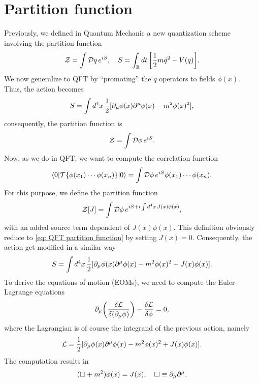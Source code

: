 \section{Partition function}
Previously, we defined in Quantum Mechanic a new quantization scheme involving the partition function 
\begin{equation}
    \mathcal{Z} = \int \mathcal{D} q\,e^{iS},\quad S = \int_{\mathbb{R}} dt\,\bigg[\frac{1}{2}m\dot{q}^2 - V(q)\bigg].
\end{equation}
We now generalize to QFT by ``promoting'' the $q$ operators to fields $\phi(x)$. Thus, the action becomes 
\begin{equation}
    S = \int d^4x\,\frac{1}{2}[\partial_\mu\phi(x)\partial^\mu\phi(x) - m^2\phi(x)^2],
\end{equation}
consequently, the partition function is 
\begin{equation}
\label{eq: QFT partition function}
    \mathcal{Z} = \int \mathcal{D}\phi\,e^{iS}.
\end{equation}
Now, as we do in QFT, we want to compute the correlation function 
\begin{equation}
    \langle 0 | \mathcal{T}{\{\phi(x_1)\cdots\phi(x_n)\}} | 0 \rangle = \int \mathcal{D}\phi\,e^{iS}\phi(x_1)\cdots\phi(x_n).
\end{equation}
For this purpose, we define the partition function
\begin{equation}
    \mathcal{Z}[J] = \int \mathcal{D}\phi\,e^{iS + i\int d^4x\,J(x)\phi(x)},
\end{equation}
with an added source term dependent of $J(x)\phi(x)$. This definition obviously reduce to \eqref{eq: QFT partition function} by setting $J(x) = 0$. Consequently, the action get modified in a similar way 
\begin{equation}
    S = \int d^4x\,\frac{1}{2}[\partial_\mu\phi(x)\partial^\mu\phi(x) - m^2\phi(x)^2 + J(x)\phi(x)].
\end{equation}
To derive the equations of motion (EOMs), we need to compute the Euler-Lagrange equations 
\begin{equation}
    \partial_\mu\bigg(\frac{\delta\mathcal{L}}{\delta(\partial_\mu\phi)}\bigg) - \frac{\delta\mathcal{L}}{\delta\phi} = 0,
\end{equation}
where the Lagrangian is of course the integrand of the previous action, namely
\begin{equation}
    \mathcal{L} = \frac{1}{2}[\partial_\mu\phi(x)\partial^\mu\phi(x) - m^2\phi(x)^2 + J(x)\phi(x)].
\end{equation}
The computation results in 
\begin{equation}
    (\square + m^2)\phi(x) = J(x),\quad \square \equiv \partial_\mu\partial^\mu.
\end{equation}
